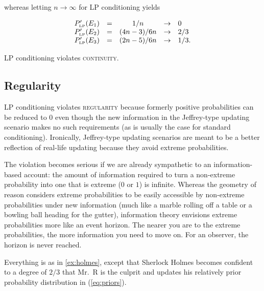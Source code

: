 \documentclass[smallextended]{svjour3}       %
\begin{document}
whereas letting $n\rightarrow\infty$ for LP conditioning yields

\begin{equation}
  \label{eq:sherlockcontlp}
  \begin{array}{rcccl}
  P'_{\mbox{\tiny LP}}(E_{1})&=&1/n&\rightarrow&0\\
  P'_{\mbox{\tiny LP}}(E_{2})&=&(4n-3)/6n&\rightarrow&2/3\\
  P'_{\mbox{\tiny LP}}(E_{3})&=&(2n-5)/6n&\rightarrow&1/3.
\end{array}
\end{equation}

LP conditioning violates \textsc{continuity}.

\subsection{Regularity}
\label{Regularity}

LP conditioning violates \textsc{regularity} because formerly positive
probabilities can be reduced to $0$ even though the new information in
the Jeffrey-type updating scenario makes no such requirements (as is
usually the case for standard conditioning). Ironically, Jeffrey-type
updating scenarios are meant to be a better reflection of real-life
updating because they avoid extreme probabilities. 

The violation becomes serious if we are already sympathetic to an
infor\-ma\-tion-based account: the amount of information required to turn
a non-extreme probability into one that is extreme ($0$ or $1$) is
infinite. Whereas the geometry of reason considers extreme
probabilities to be easily accessible by non-extreme probabilities
under new information (much like a marble rolling off a table or a
bowling ball heading for the gutter), information theory envisions
extreme probabilities more like an event horizon. The nearer you are
to the extreme probabilities, the more information you need to move
on. For an observer, the horizon is never reached.

\begin{quotex}
  \label{ex:regularity} Everything is as
  in {\xample} \ref{ex:holmes}, except that Sherlock Holmes becomes
  confident to a degree of $2/3$ that Mr.\ R is the culprit and
  updates his relatively prior probability distribution in
  (\ref{eq:priors}).
\end{quotex}
\end{document}
